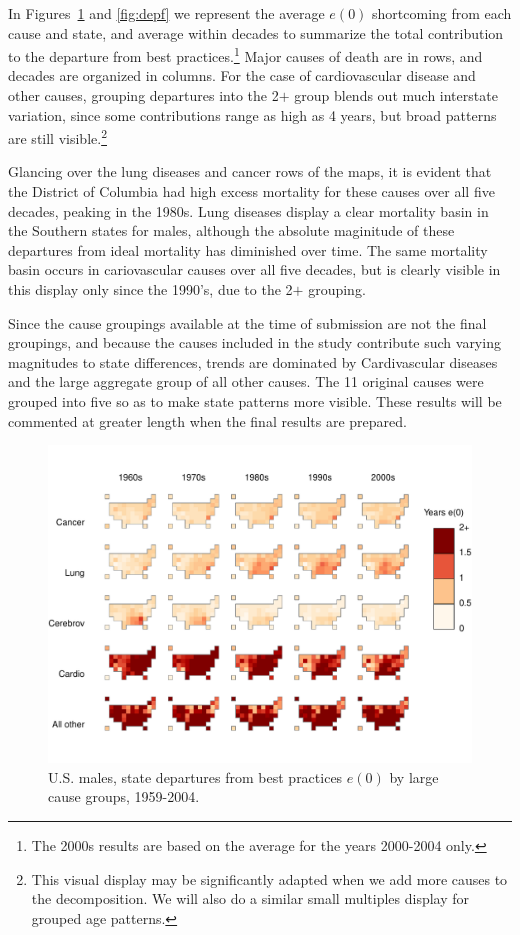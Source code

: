 \documentclass[11pt,oneside,a4paper]{article} %
\begin{document}
In Figures~\ref{fig:depm} and \ref{fig:depf} we represent the average $e(0)$
shortcoming from each cause and state, and average within decades to summarize the total contribution
to the departure from best practices.\footnote{The 2000s results are based on
the average for the years 2000-2004 only.} Major causes of death are in rows,
and decades are organized in columns. For the case of cardiovascular disease and other causes, grouping departures into the 2$+$ group blends out much
interstate variation, since some contributions range as high as 4
years, but broad patterns are still visible.\footnote{This visual display may be
significantly adapted when we add more causes to the decomposition. We will also do a similar small multiples
display for grouped age patterns.}

Glancing over the lung diseases and cancer rows of the maps, it is evident that
the District of Columbia had high excess mortality for these causes over all
five decades, peaking in the 1980s. Lung diseases display a clear mortality
basin in the Southern states for males, although the absolute maginitude of these departures from ideal mortality has diminished over time. The same mortality basin occurs in
cariovascular causes over all five decades, but is clearly visible in this
display only since the 1990's, due to the 2$+$ grouping.

Since the cause groupings available at the time of submission are not the final groupings, and
because the causes included in the study contribute such varying magnitudes to
state differences, trends are dominated by Cardivascular diseases and the large
aggregate group of all other causes. The 11 original causes were grouped into
five so as to make state patterns more visible. These results will be commented
at greater length when the final results are prepared.

\begin{figure}
\centering
\caption{U.S. males, state departures from best practices $e(0)$ by large cause
groups, 1959-2004.}
\label{fig:depm}
\includegraphics[scale=0.7]{Figures/StatesDecadesM.pdf}
\end{figure}
\end{document}
